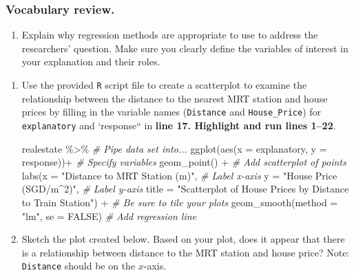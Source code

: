\documentclass[
]{report}
\newenvironment{Shaded}{\begin{snugshade}}{\end{snugshade}}
\newcommand{\AttributeTok}[1]{\textcolor[rgb]{0.77,0.63,0.00}{#1}}
\newcommand{\CommentTok}[1]{\textcolor[rgb]{0.56,0.35,0.01}{\textit{#1}}}
\newcommand{\ConstantTok}[1]{\textcolor[rgb]{0.00,0.00,0.00}{#1}}
\newcommand{\FunctionTok}[1]{\textcolor[rgb]{0.00,0.00,0.00}{#1}}
\newcommand{\NormalTok}[1]{#1}
\newcommand{\SpecialCharTok}[1]{\textcolor[rgb]{0.00,0.00,0.00}{#1}}
\newcommand{\StringTok}[1]{\textcolor[rgb]{0.31,0.60,0.02}{#1}}
\providecommand{\tightlist}{%
  \setlength{\itemsep}{0pt}\setlength{\parskip}{0pt}}
\begin{document}
\hypertarget{vocabulary-review.-5}{%
\subsubsection*{Vocabulary review.}\label{vocabulary-review.-5}}

\begin{enumerate}
\def\labelenumi{\arabic{enumi}.}
\tightlist
\item
  Explain why regression methods are appropriate to use to address the researchers' question. Make sure you clearly define the variables of interest in your explanation and their roles.
\end{enumerate}

\vspace{.5in}

\begin{enumerate}
\def\labelenumi{\arabic{enumi}.}
\setcounter{enumi}{1}
\item
  Use the provided \texttt{R} script file to create a scatterplot to examine the relationship between the distance to the nearest MRT station and house prices by filling in the variable names (\texttt{Distance} and \texttt{House\_Price}) for \texttt{explanatory} and `response`` in \textbf{line 17. Highlight and run lines 1--22}.

\begin{Shaded}
\begin{Highlighting}[]
\NormalTok{realestate }\SpecialCharTok{\%\textgreater{}\%} \CommentTok{\# Pipe data set into...}
\FunctionTok{ggplot}\NormalTok{(}\FunctionTok{aes}\NormalTok{(}\AttributeTok{x =}\NormalTok{ explanatory, }\AttributeTok{y =}\NormalTok{ response))}\SpecialCharTok{+}  \CommentTok{\# Specify variables}
  \FunctionTok{geom\_point}\NormalTok{() }\SpecialCharTok{+}  \CommentTok{\# Add scatterplot of points}
  \FunctionTok{labs}\NormalTok{(}\AttributeTok{x =} \StringTok{"Distance to MRT Station (m)"}\NormalTok{,  }\CommentTok{\# Label x{-}axis}
       \AttributeTok{y =} \StringTok{"House Price (SGD/m\^{}2)"}\NormalTok{,  }\CommentTok{\# Label y{-}axis}
       \AttributeTok{title =} \StringTok{"Scatterplot of House Prices by Distance to Train Station"}\NormalTok{) }\SpecialCharTok{+} 
               \CommentTok{\# Be sure to tile your plots}
  \FunctionTok{geom\_smooth}\NormalTok{(}\AttributeTok{method =} \StringTok{"lm"}\NormalTok{, }\AttributeTok{se =} \ConstantTok{FALSE}\NormalTok{)  }\CommentTok{\# Add regression line}
\end{Highlighting}
\end{Shaded}
\item
  Sketch the plot created below. Based on your plot, does it appear that there is a relationship between distance to the MRT station and house price? Note: \texttt{Distance} should be on the \(x\)-axis.
\end{enumerate}
\end{document}
